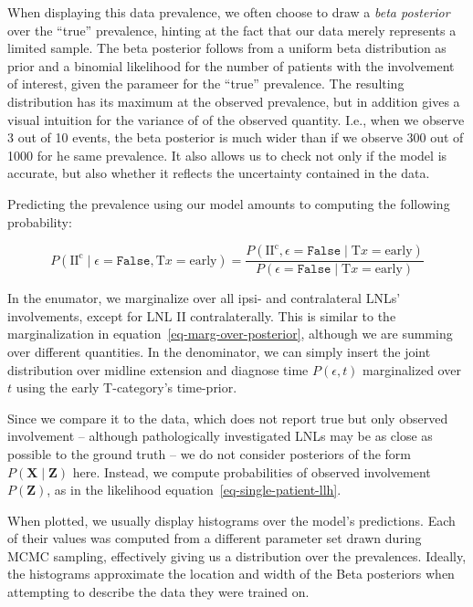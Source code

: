 \documentclass[
  sn-mathphys-num,
]{sn-jnl}
\begin{document}
When displaying this data prevalence, we often choose to draw a
\emph{beta posterior} over the ``true'' prevalence, hinting at the fact
that our data merely represents a limited sample. The beta posterior
follows from a uniform beta distribution as prior and a binomial
likelihood for the number of patients with the involvement of interest,
given the parameer for the ``true'' prevalence. The resulting
distribution has its maximum at the observed prevalence, but in addition
gives a visual intuition for the variance of of the observed quantity.
I.e., when we observe 3 out of 10 events, the beta posterior is much
wider than if we observe 300 out of 1000 for he same prevalence. It also
allows us to check not only if the model is accurate, but also whether
it reflects the uncertainty contained in the data.

Predicting the prevalence using our model amounts to computing the
following probability:

\[
P \left( \text{II}^\text{c} \mid \epsilon=\texttt{False}, \text{T}x=\text{early} \right) = \frac{P \left( \text{II}^\text{c}, \epsilon=\texttt{False} \mid \text{T}x=\text{early} \right)}{P \left( \epsilon=\texttt{False} \mid \text{T}x=\text{early} \right)}
\]

In the enumator, we marginalize over all ipsi- and contralateral LNLs'
involvements, except for LNL II contralaterally. This is similar to the
marginalization in equation~\ref{eq-marg-over-posterior}, although we
are summing over different quantities. In the denominator, we can simply
insert the joint distribution over midline extension and diagnose time
\(P \left( \epsilon, t \right)\) marginalized over \(t\) using the early
T-category's time-prior.

Since we compare it to the data, which does not report true but only
observed involvement -- although pathologically investigated LNLs may be
as close as possible to the ground truth -- we do not consider
posteriors of the form \(P \left( \mathbf{X} \mid \mathbf{Z} \right)\)
here. Instead, we compute probabilities of observed involvement
\(P \left( \mathbf{Z} \right)\), as in the likelihood
equation~\ref{eq-single-patient-llh}.

When plotted, we usually display histograms over the model's
predictions. Each of their values was computed from a different
parameter set drawn during MCMC sampling, effectively giving us a
distribution over the prevalences. Ideally, the histograms approximate
the location and width of the Beta posteriors when attempting to
describe the data they were trained on.
\end{document}
